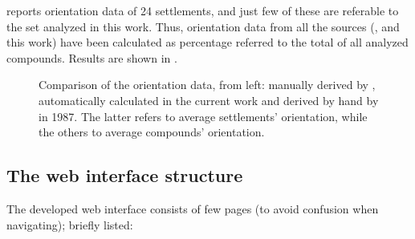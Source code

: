             \cite{jones-tavoliere} reports orientation data of 24 settlements, and just few of these are referable to the set analyzed in this work. Thus, orientation data from all the sources (\cite{laterza}, \cite{jones-tavoliere} and this work) have been calculated as percentage referred to the total of all analyzed compounds. Results are shown in .

            \begin{figure}[H]
                \centering
                \begin{tikzpicture}
                    
                \end{tikzpicture}
                \caption[Comparison of automatically derived orientation data with the other sources.]{Comparison of the orientation data, from left: manually derived by \citeauthor{laterza}, automatically calculated in the current work and derived by hand by \citeauthor{jones-tavoliere} in 1987. The latter refers to average settlements' orientation, while the others to average compounds' orientation.}
                \label{fig:graph-orient-jones}
            \end{figure}

        \subsection{The web interface structure\label{sec:webgis}}
            The developed web interface consists of few pages (to avoid confusion when navigating); briefly listed:


